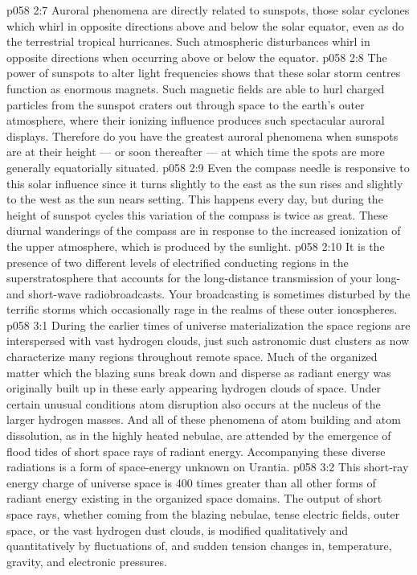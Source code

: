 \vs p058 2:7 Auroral phenomena are directly related to sunspots, those solar cyclones which whirl in opposite directions above and below the solar equator, even as do the terrestrial tropical hurricanes. Such atmospheric disturbances whirl in opposite directions when occurring above or below the equator.
\vs p058 2:8 The power of sunspots to alter light frequencies shows that these solar storm centres function as enormous magnets. Such magnetic fields are able to hurl charged particles from the sunspot craters out through space to the earth’s outer atmosphere, where their ionizing influence produces such spectacular auroral displays. Therefore do you have the greatest auroral phenomena when sunspots are at their height --- or soon thereafter --- at which time the spots are more generally equatorially situated.
\vs p058 2:9 Even the compass needle is responsive to this solar influence since it turns slightly to the east as the sun rises and slightly to the west as the sun nears setting. This happens every day, but during the height of sunspot cycles this variation of the compass is twice as great. These diurnal wanderings of the compass are in response to the increased ionization of the upper atmosphere, which is produced by the sunlight.
\vs p058 2:10 It is the presence of two different levels of electrified conducting regions in the superstratosphere that accounts for the long\hyp{}distance transmission of your long\hyp{} and short\hyp{}wave radiobroadcasts. Your broadcasting is sometimes disturbed by the terrific storms which occasionally rage in the realms of these outer ionospheres.
\vs p058 3:1 During the earlier times of universe materialization the space regions are interspersed with vast hydrogen clouds, just such astronomic dust clusters as now characterize many regions throughout remote space. Much of the organized matter which the blazing suns break down and disperse as radiant energy was originally built up in these early appearing hydrogen clouds of space. Under certain unusual conditions atom disruption also occurs at the nucleus of the larger hydrogen masses. And all of these phenomena of atom building and atom dissolution, as in the highly heated nebulae, are attended by the emergence of flood tides of short space rays of radiant energy. Accompanying these diverse radiations is a form of space\hyp{}energy unknown on Urantia.
\vs p058 3:2 This short\hyp{}ray energy charge of universe space is 400 times greater than all other forms of radiant energy existing in the organized space domains. The output of short space rays, whether coming from the blazing nebulae, tense electric fields, outer space, or the vast hydrogen dust clouds, is modified qualitatively and quantitatively by fluctuations of, and sudden tension changes in, temperature, gravity, and electronic pressures.
